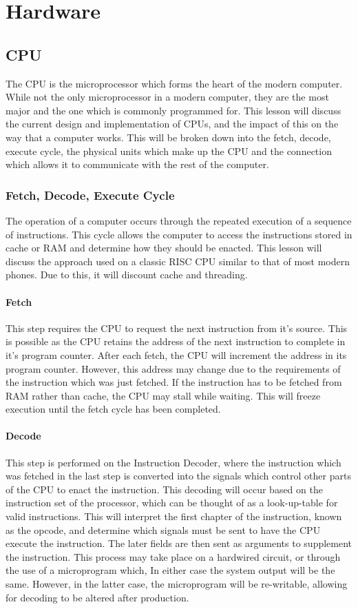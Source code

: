 \documentclass[a4paper,11pt]{report}
\begin{document}
	\section{Hardware}
		\subsection{CPU} 
			The CPU is the microprocessor which forms the heart of the modern computer. 
			While not the only microprocessor in a modern computer, they are the most major and the one which is commonly programmed for. 
			This lesson will discuss the current design and implementation of CPUs, and the impact of this on the way that a computer works. 
			This will be broken down into the fetch, decode, execute cycle, the physical units which make up the CPU and the connection which allows it to communicate with the rest of the computer. 
			\subsubsection{Fetch, Decode, Execute Cycle}
				The operation of a computer occurs through the repeated execution of a sequence of instructions.
				This cycle allows the computer to access the instructions stored in cache or RAM and determine how they should be enacted. This lesson will discuss the approach used on a classic RISC CPU similar to that of most modern phones. 
				Due to this, it will discount cache and threading. 
				\paragraph{Fetch}
					This step requires the CPU to request the next instruction from it's source. 
					This is possible as the CPU retains the address of the next instruction to complete in it's program counter. 
					After each fetch, the CPU will increment the address in its program counter. 
					However, this address may change due to the requirements of the instruction which was just fetched. 
					If the instruction has to be fetched from RAM rather than cache, the CPU may stall while waiting.
					This will freeze execution until the fetch cycle has been completed. 
				\paragraph{Decode}
					This step is performed on the Instruction Decoder, where the instruction which was fetched in the last step is converted into the signals which control other parts of the CPU to enact the instruction. 
					This decoding will occur based on the instruction set of the processor, which can be thought of as a look-up-table for valid instructions. 
					This will interpret the first chapter of the instruction, known as the opcode, and determine which signals must be sent to have the CPU execute the instruction. 
					The later fields are then sent as arguments to supplement the instruction. 
					This process may take place on a hardwired circuit, or through the use of a microprogram which, In either case the system output will be the same. 
					However, in the latter case, the microprogram will be re-writable, allowing for decoding to be altered after production. 
\end{document}
